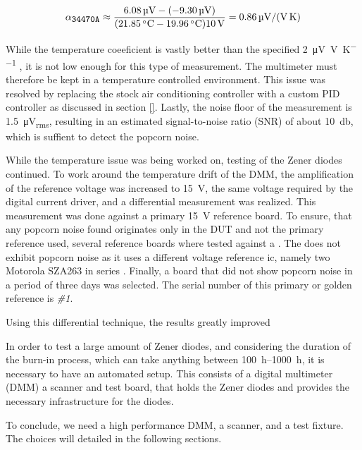 \begin{equation}
    \alpha_{\texttt{\small 34470A}} \approx \frac{\qty{6.08}{\micro\volt}-(-\qty{9.30}{\micro\volt})}{(\qty{21.85}{\celsius}-\qty{19.96}{\celsius})\qty{10}{\volt}} = \qty[per-mode=symbol]{0.86}{\micro\volt \per \volt \per \kelvin}
\end{equation}

While the temperature coeeficient is vastly better than the specified \qty[per-mode=symbol]{2}{\micro\volt \per \volt \per \kelvin} \cite{datasheet_keysight34470A}, it is not low enough for this type of measurement. The multimeter must therefore be kept in a temperature controlled environment. This issue was resolved by replacing the stock air conditioning controller with a custom PID controller as discussed in section \ref{}. Lastly, the noise floor of the measurement is \qty{1.5}{\micro\volt_{rms}}, resulting in an estimated signal-to-noise ratio (SNR) of about \qty{10}{\decibel}, which is suffient to detect the popcorn noise.

While the temperature issue was being worked on, testing of the Zener diodes continued. To work around the temperature drift of the DMM, the amplification of the reference voltage was increased to \qty{15}{\volt}, the same voltage required by the digital current driver, and a differential measurement was realized. This measurement was done against a primary \qty{15}{\volt} reference board. To ensure, that any popcorn noise found originates only in the DUT and not the primary reference used, several reference boards where tested against a . The  does not exhibit popcorn noise as it uses a different voltage reference ic, namely two Motorola SZA263 in series \cite{service_manual_fluke_5440b}. Finally, a board that did not show popcorn noise in a period of three days was selected. The serial number of this primary or golden reference is \textit{\#1}.

Using this differential technique, the results greatly improved

In order to test a large amount of Zener diodes, and considering the duration of the burn-in process, which can take anything between \qtyrange{100}{1000}{\hour}, it is necessary to have an automated setup. This consists of a digital multimeter (DMM) a scanner and test board, that holds the Zener diodes and provides the necessary infrastructure for the diodes.



To conclude, we need a high performance DMM, a scanner, and a test fixture. The choices will detailed in the following sections.



